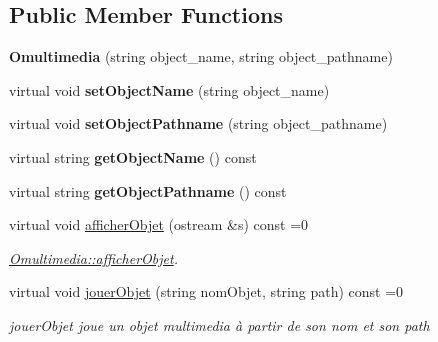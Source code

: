 \subsection*{Public Member Functions}
\begin{DoxyCompactItemize}
\item 
\hypertarget{class_omultimedia_a7f1e73b963ad35cf904c1ca05836c90d}{{\bfseries Omultimedia} (string object\+\_\+name, string object\+\_\+pathname)}\label{class_omultimedia_a7f1e73b963ad35cf904c1ca05836c90d}

\item 
\hypertarget{class_omultimedia_a9f9f433c1156c1febf54b88037de8ddb}{virtual void {\bfseries set\+Object\+Name} (string object\+\_\+name)}\label{class_omultimedia_a9f9f433c1156c1febf54b88037de8ddb}

\item 
\hypertarget{class_omultimedia_a4e8aebf79dbc7759e9566eaa18f00b38}{virtual void {\bfseries set\+Object\+Pathname} (string object\+\_\+pathname)}\label{class_omultimedia_a4e8aebf79dbc7759e9566eaa18f00b38}

\item 
\hypertarget{class_omultimedia_ae6404617513dd4b667fee79b72be6fb0}{virtual string {\bfseries get\+Object\+Name} () const }\label{class_omultimedia_ae6404617513dd4b667fee79b72be6fb0}

\item 
\hypertarget{class_omultimedia_a6f503402124f2c086c62ca473b3295e4}{virtual string {\bfseries get\+Object\+Pathname} () const }\label{class_omultimedia_a6f503402124f2c086c62ca473b3295e4}

\item 
virtual void \hyperlink{class_omultimedia_ae8942bb1db61d92962a71bbe7512c037}{afficher\+Objet} (ostream \&s) const =0
\begin{DoxyCompactList}\small\item\em \hyperlink{class_omultimedia_ae8942bb1db61d92962a71bbe7512c037}{Omultimedia\+::afficher\+Objet}. \end{DoxyCompactList}\item 
virtual void \hyperlink{class_omultimedia_ab3836cd1744e98bdc6752ebd0283911e}{jouer\+Objet} (string nom\+Objet, string path) const =0
\begin{DoxyCompactList}\small\item\em jouer\+Objet joue un objet multimedia à partir de son nom et son path \end{DoxyCompactList}\end{DoxyCompactItemize}


